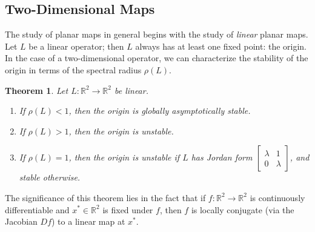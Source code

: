 \documentclass{article}
\newcommand{\reals}{\mathbb{R}}
\theoremstyle{plain}
\newtheorem{theorem}{Theorem}
\theoremstyle{definition}
\DeclarePairedDelimiter{\parensproto}{\lparen}{\rparen}
\newcommand{\parens}{\parensproto*}
\DeclarePairedDelimiter{\bracksproto}{\lbrack}{\rbrack}
\newcommand{\bracks}{\bracksproto*}
\DeclarePairedDelimiter{\lhalfopenproto}{\lparen}{\rbrack}
\newcommand{\lhalfopen}{\lhalfopenproto*}
\newcommand{\jacobian}[1]{D{#1}}
\begin{document}

\subsection{Two-Dimensional Maps}

The study of planar maps in general begins with the study of \emph{linear} planar maps. Let \(L\) be a linear operator; then \(L\) always has at least one fixed point: the origin. In the case of a two-dimensional operator, we can characterize the stability of the origin in terms of the spectral radius \(\rho(L)\).

\begin{theorem}
  Let \(L : \reals^2 \to \reals^2\) be linear.
  \begin{enumerate}
  \item If \(\rho(L) < 1\), then the origin is globally asymptotically stable.
  \item If \(\rho(L) > 1\), then the origin is unstable.
  \item If \(\rho(L) = 1\), then the origin is unstable if \(L\) has Jordan form \(\begin{bmatrix} \lambda & 1 \\ 0 & \lambda \end{bmatrix}\), and stable otherwise.
  \end{enumerate}
\end{theorem}

The significance of this theorem lies in the fact that if \(f : \reals^2 \to \reals^2\) is continuously differentiable and \(x^* \in \reals^2\) is fixed under \(f\), then \(f\) is locally conjugate (via the Jacobian \(\jacobian{f}\)) to a linear map at \(x^*\).
\end{document}
